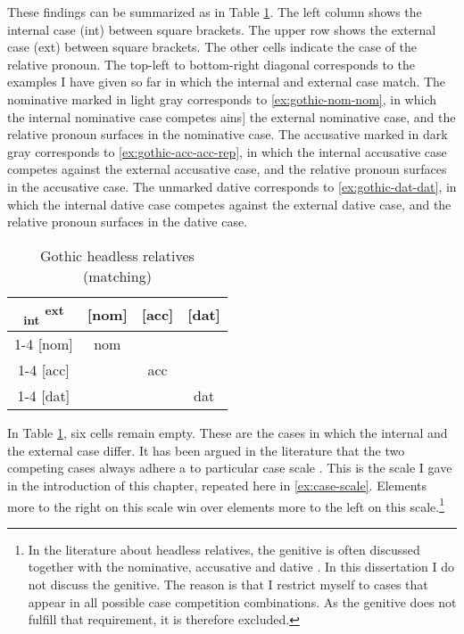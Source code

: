 These findings can be summarized as in Table \ref{tbl:summary-gothic-matching}. The left column shows the internal case (\ac{int}) between square brackets. The upper row shows the external case (\ac{ext}) between square brackets. The other cells indicate the case of the relative pronoun. The top-left to bottom-right diagonal corresponds to the examples I have given so far in which the internal and external case match. The nominative marked in light gray corresponds to \ref{ex:gothic-nom-nom}, in which the internal nominative case competes ains] the external nominative case, and the relative pronoun surfaces in the nominative case. The accusative marked in dark gray corresponds to \ref{ex:gothic-acc-acc-rep}, in which the internal accusative case competes against the external accusative case, and the relative pronoun surfaces in the accusative case.
The unmarked dative corresponds to \ref{ex:gothic-dat-dat}, in which the internal dative case competes against the external dative case, and the relative pronoun surfaces in the dative case.

\begin{table}[ht]
 \center
 \caption{Gothic headless relatives (matching)}
 \begin{tabular}{c|c|c|c}
   \toprule
    \textsubscript{\ac{int}} \textsuperscript{\ac{ext}}
         & [\ac{nom}]
         & [\ac{acc}]
         & [\ac{dat}]
         \\ \cmidrule{1-4}
     [\ac{nom}]
         & \colorbox{LG}{\ac{nom}}
         &
         &
         \\ \cmidrule{1-4}
     [\ac{acc}]
         &
         & \colorbox{DG}{\ac{acc}}
         &
         \\ \cmidrule{1-4}
     [\ac{dat}]
         &
         &
         & \ac{dat}
         \\
   \bottomrule
 \end{tabular}
   \label{tbl:summary-gothic-matching}
\end{table}

In Table \ref{tbl:summary-gothic-matching}, six cells remain empty. These are the cases in which the internal and the external case differ.
It has been argued in the literature that the two competing cases always adhere a to particular case scale \citep[cf.][]{harbert1978,pittner1995,vogel2001,grosu2003,caha2019,bergsma2019}. This is the scale I gave in the introduction of this chapter, repeated here in \ref{ex:case-scale}. Elements more to the right on this scale win over elements more to the left on this scale.\footnote{
In the literature about headless relatives, the genitive is often discussed together with the nominative, accusative and dative \citep[cf.][]{harbert1978,pittner1995}. In this dissertation I do not discuss the genitive. The reason is that I restrict myself to cases that appear in all possible case competition combinations. As the genitive does not fulfill that requirement, it is therefore excluded.
}

